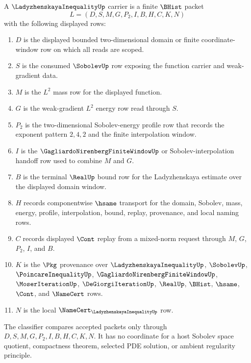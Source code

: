 \begin{definition}
\label{def:ladyzhenskaya-inequality-carrier}
A $\LadyzhenskayaInequalityUp$ carrier is a finite $\BHist$ packet
$$
L=(D,S,M,G,P_2,I,B,H,C,K,N)
$$
with the following displayed rows:
\begin{enumerate}
\item $D$ is the displayed bounded two-dimensional domain or finite coordinate-window row on which all reads are scoped.
\item $S$ is the consumed $\SobolevUp$ row exposing the function carrier and weak-gradient data.
\item $M$ is the $L^2$ mass row for the displayed function.
\item $G$ is the weak-gradient $L^2$ energy row read through $S$.
\item $P_2$ is the two-dimensional Sobolev-energy profile row that records the exponent pattern $2,4,2$ and the finite interpolation window.
\item $I$ is the $\GagliardoNirenbergFiniteWindowUp$ or Sobolev-interpolation handoff row used to combine $M$ and $G$.
\item $B$ is the terminal $\RealUp$ bound row for the Ladyzhenskaya estimate over the displayed domain window.
\item $H$ records componentwise $\hsame$ transport for the domain, Sobolev, mass, energy, profile, interpolation, bound, replay, provenance, and local naming rows.
\item $C$ records displayed $\Cont$ replay from a mixed-norm request through $M$, $G$, $P_2$, $I$, and $B$.
\item $K$ is the $\Pkg$ provenance over $\LadyzhenskayaInequalityUp$, $\SobolevUp$, $\PoincareInequalityUp$, $\GagliardoNirenbergFiniteWindowUp$, $\MoserIterationUp$, $\DeGiorgiIterationUp$, $\RealUp$, $\BHist$, $\hsame$, $\Cont$, and $\NameCert$ rows.
\item $N$ is the local $\NameCert_{\LadyzhenskayaInequalityUp}$ row.
\end{enumerate}
The classifier compares accepted packets only through $D,S,M,G,P_2,I,B,H,C,K,N$. It has no coordinate for a host Sobolev space quotient, compactness theorem, selected PDE solution, or ambient regularity principle.
\end{definition}


